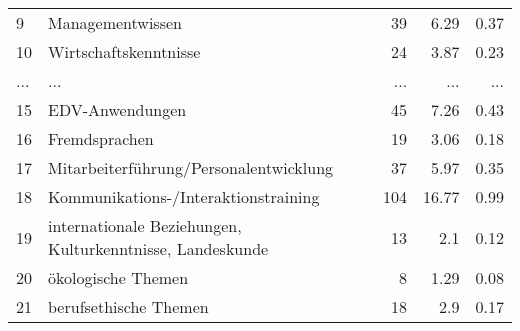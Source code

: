 \begin{longtable}{lXrrr}
        9 & \multicolumn{1}{X}{Managementwissen} & %
          \num{39} &
          \num[round-mode=places,round-precision=2]{6.29} &
          \num[round-mode=places,round-precision=2]{0.37} \\
        10 & \multicolumn{1}{X}{Wirtschaftskenntnisse} & %
          \num{24} &
          \num[round-mode=places,round-precision=2]{3.87} &
          \num[round-mode=places,round-precision=2]{0.23} \\
       ... & ... & ... & ... & ... \\
        15 & \multicolumn{1}{X}{EDV-Anwendungen} & %
          \num{45} &
          \num[round-mode=places,round-precision=2]{7.26} &
          \num[round-mode=places,round-precision=2]{0.43} \\

        16 & \multicolumn{1}{X}{Fremdsprachen} & %
          \num{19} &
          \num[round-mode=places,round-precision=2]{3.06} &
          \num[round-mode=places,round-precision=2]{0.18} \\

        17 & \multicolumn{1}{X}{Mitarbeiterführung/Personalentwicklung} & %
          \num{37} &
          \num[round-mode=places,round-precision=2]{5.97} &
          \num[round-mode=places,round-precision=2]{0.35} \\

        18 & \multicolumn{1}{X}{Kommunikations-/Interaktionstraining} & %
          \num{104} &
          \num[round-mode=places,round-precision=2]{16.77} &
          \num[round-mode=places,round-precision=2]{0.99} \\

        19 & \multicolumn{1}{X}{internationale Beziehungen, Kulturkenntnisse, Landeskunde} & %
          \num{13} &
          \num[round-mode=places,round-precision=2]{2.1} &
          \num[round-mode=places,round-precision=2]{0.12} \\

        20 & \multicolumn{1}{X}{ökologische Themen} & %
          \num{8} &
          \num[round-mode=places,round-precision=2]{1.29} &
          \num[round-mode=places,round-precision=2]{0.08} \\

        21 & \multicolumn{1}{X}{berufsethische Themen} & %
          \num{18} &
          \num[round-mode=places,round-precision=2]{2.9} &
          \num[round-mode=places,round-precision=2]{0.17} \\


\end{longtable}
